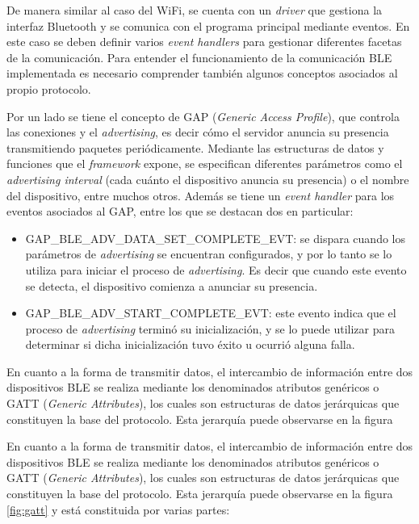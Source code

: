 De manera similar al caso del WiFi, se cuenta con un \emph{driver} que gestiona la interfaz Bluetooth y se comunica con el programa principal mediante eventos. En este caso se deben definir varios \emph{event handlers} para gestionar diferentes facetas de la comunicación. Para entender el funcionamiento de la comunicación BLE implementada es necesario comprender también algunos conceptos asociados al propio protocolo. 

Por un lado se tiene el concepto de GAP (\emph{Generic Access Profile}), que controla las conexiones y el \emph{advertising}, es decir cómo el servidor anuncia su presencia transmitiendo paquetes periódicamente. Mediante las estructuras de datos y funciones que el \emph{framework} expone, se especifican diferentes parámetros como el \emph{advertising interval} (cada cuánto el dispositivo anuncia su presencia) o el nombre del dispositivo, entre muchos otros. Además se tiene un \emph{event handler} para los eventos asociados al GAP, entre los que se destacan dos en particular:

\begin{itemize}
	\item GAP\_BLE\_ADV\_DATA\_SET\_COMPLETE\_EVT: se dispara cuando los parámetros de \emph{advertising} se encuentran configurados, y por lo tanto se lo utiliza para iniciar el proceso de \emph{advertising}. Es decir que cuando este evento se detecta, el dispositivo comienza a anunciar su presencia.
	\item GAP\_BLE\_ADV\_START\_COMPLETE\_EVT: este evento indica que el proceso de \emph{advertising} terminó su inicialización, y se lo puede utilizar para determinar si dicha inicialización tuvo éxito u ocurrió alguna falla. 
\end{itemize}

En cuanto a la forma de transmitir datos, el intercambio de información entre dos dispositivos BLE se realiza mediante los denominados atributos genéricos o GATT (\emph{Generic Attributes}), los cuales son estructuras de datos jerárquicas que constituyen la base del protocolo. Esta jerarquía puede observarse en la figura 

En cuanto a la forma de transmitir datos, el intercambio de información entre dos dispositivos BLE se realiza mediante los denominados atributos genéricos o GATT (\emph{Generic Attributes}), los cuales son estructuras de datos jerárquicas que constituyen la base del protocolo. Esta jerarquía puede observarse en la figura \ref{fig:gatt} y está constituida por varias partes:

